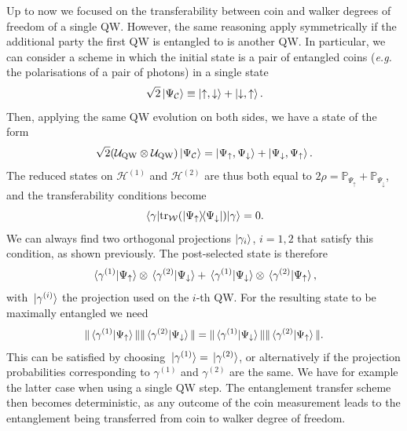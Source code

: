 \documentclass[
	aps, pra,
	superscriptaddress, twocolumn,
	floatfix,
	10pt
]{revtex4-1}
\newcommand{\on}[1]{\operatorname{#1}}
\newcommand{\parTitle}[1]{\noindent{\color{Mahogany}(\emph{#1})}}
\newcommand{\PP}{\mathbb{P}}
\newcommand{\calC}{{\mathcal{C}}}
\newcommand{\calH}{{\mathcal{H}}}
\newcommand{\calU}{{\mathcal{U}}}
\newcommand{\calW}{{\mathcal{W}}}
\begin{document}
\parTitle{Pair of QWs}
Up to now we focused on the transferability between coin and walker degrees of freedom of a single QW.
However, the same reasoning apply symmetrically if the additional party the first QW is entangled to is another QW.
In particular, we can consider a scheme in which the initial state is a pair of entangled coins (\emph{e.g.} the polarisations of a pair of photons) in a single state
\begin{equation}
	\sqrt2\ket{\Psi_{\calC}}\equiv \ket{\uparrow,\downarrow} + \ket{\downarrow,\uparrow}.
\end{equation}
Then, applying the same QW evolution on both sides, we have a state of the form
\begin{equation}
	\sqrt2(\calU_{\on{QW}}\otimes \calU_{\on{QW}}) \ket{\Psi_{\calC}} =
	\ket{\Psi_\uparrow,\Psi_\downarrow} +
	\ket{\Psi_\downarrow,\Psi_\uparrow}.
\end{equation}
The reduced states on $\calH^{(1)}$ and $\calH^{(2)}$ are thus both equal to
	$2\rho = \PP_{\Psi_\uparrow} + \PP_{\Psi_\downarrow}$,
and the transferability conditions become
\begin{equation}
	\mel{\gamma}{\tr_{\calW}(\ketbra{\Psi_\uparrow}{\Psi_\downarrow})}{\gamma} = 0.
\end{equation}
We can always find two orthogonal projections $\ket{\gamma_i}$, $i=1,2$ that satisfy this condition, as shown previously.
The post-selected state is therefore
\begin{equation}
	\braket*{\gamma^{(1)}}{\Psi_\uparrow}\otimes \braket*{\gamma^{(2)}}{\Psi_\downarrow}
	+
	\braket*{\gamma^{(1)}}{\Psi_\downarrow}\otimes \braket*{\gamma^{(2)}}{\Psi_\uparrow},
\end{equation}
with $\ket*{\gamma^{(i)}}$ the projection used on the $i$-th QW.
For the resulting state to be maximally entangled we need
\begin{equation}\scalebox{0.96}{$\displaystyle
	\|\braket*{\gamma^{(1)}}{\Psi_\uparrow}\|
	\|\braket*{\gamma^{(2)}}{\Psi_\downarrow}\|
	=
	\|\braket*{\gamma^{(1)}}{\Psi_\downarrow}\|
	\|\braket*{\gamma^{(2)}}{\Psi_\uparrow}\|.
$}\end{equation}
This can be satisfied by choosing $\ket*{\gamma^{(1)}}=\ket*{\gamma^{(2)}}$, or alternatively if the projection probabilities corresponding to $\gamma^{(1)}$ and $\gamma^{(2)}$ are the same.
We have for example the latter case when using a single QW step.
The entanglement transfer scheme then becomes deterministic, as any outcome of the coin measurement leads to the entanglement being transferred from coin to walker degree of freedom.
\end{document}
